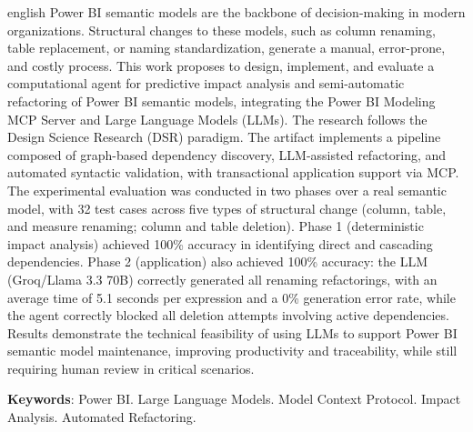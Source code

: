 \documentclass[
    12pt,               %
    openright,          %
    oneside,            %
    a4paper,            %
    chapter=TITLE,      %
    section=TITLE,      %
    brazil              %
]{abntex2}
\begin{document}
\begin{resumo}[Abstract]
    \begin{otherlanguage*}{english}
        Power BI semantic models are the backbone of decision-making in modern organizations. Structural changes to these models, such as column renaming, table replacement, or naming standardization, generate a manual, error-prone, and costly process. This work proposes to design, implement, and evaluate a computational agent for predictive impact analysis and semi-automatic refactoring of Power BI semantic models, integrating the Power BI Modeling MCP Server and Large Language Models (LLMs). The research follows the Design Science Research (DSR) paradigm. The artifact implements a pipeline composed of graph-based dependency discovery, LLM-assisted refactoring, and automated syntactic validation, with transactional application support via MCP. The experimental evaluation was conducted in two phases over a real semantic model, with 32 test cases across five types of structural change (column, table, and measure renaming; column and table deletion). Phase 1 (deterministic impact analysis) achieved 100\% accuracy in identifying direct and cascading dependencies. Phase 2 (application) also achieved 100\% accuracy: the LLM (Groq/Llama 3.3 70B) correctly generated all renaming refactorings, with an average time of 5.1 seconds per expression and a 0\% generation error rate, while the agent correctly blocked all deletion attempts involving active dependencies. Results demonstrate the technical feasibility of using LLMs to support Power BI semantic model maintenance, improving productivity and traceability, while still requiring human review in critical scenarios.

        \vspace{\onelineskip}
        \noindent\textbf{Keywords}: Power BI. Large Language Models. Model Context Protocol. Impact Analysis. Automated Refactoring.
    \end{otherlanguage*}
\end{resumo}

\listoffigures*
\cleardoublepage

\listoftables*
\cleardoublepage
\end{document}
